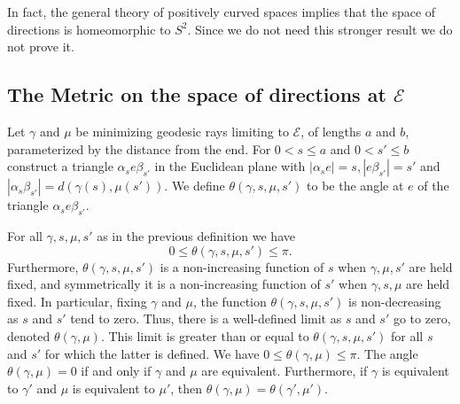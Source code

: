\begin{remark}
\label{rem:space-of-directions-topology}
In fact, the general theory of positively curved spaces implies that
the space of directions is homeomorphic to $S^2$. Since we do not
need this stronger result we do not prove it.
\end{remark}

\subsection{The Metric on the space of directions at ${\mathcal
E}$}



\begin{definition}
\label{def:angle-between-directions-theta}
\label{defntheta}
Let $\gamma$ and $\mu$ be minimizing geodesic rays limiting to
${\mathcal E}$, of lengths $a$ and $b$, parameterized by the
distance from the end. For $0<s\le a$ and $0<s'\le b$ construct a
triangle $\alpha_se\beta_{s'}$ in the Euclidean plane with
$|\alpha_se|=s, |e\beta_{s'}|=s'$ and
$|\alpha_s\beta_{s'}|=d(\gamma(s),\mu(s'))$. We define
$\theta(\gamma,s,\mu,s')$ to be the angle at $e$ of the triangle
$\alpha_se\beta_{s'}$.
\end{definition}

\begin{lemma}
\label{lem:theta-monotone-convergence}
\label{thetaconv}
For all $\gamma,s,\mu,s'$ as in the previous definition we have
$$0\le \theta(\gamma,s,\mu,s')\le \pi.$$ Furthermore,  $\theta(\gamma,s,\mu,s')$
is a non-increasing function of $s$  when $\gamma,\mu,s'$ are held
fixed, and symmetrically it is a non-increasing function of $s'$
when $\gamma,s,\mu$ are held fixed. In particular, fixing $\gamma$
and $\mu$, the function $\theta(\gamma,s,\mu,s')$ is non-decreasing
as $s$ and $s'$ tend to zero. Thus, there is a well-defined limit as
$s$ and $s'$ go to zero, denoted $ \theta(\gamma,\mu)$. This limit
is greater than or equal to $\theta(\gamma,s,\mu,s')$ for all $s$
and $s'$ for which the latter is defined. We have
$0\le\theta(\gamma,\mu)\le \pi$. The angle $\theta(\gamma,\mu)=0$ if
and only if $\gamma$ and $\mu$ are equivalent. Furthermore, if
$\gamma$ is equivalent to $\gamma'$ and $\mu$ is equivalent to
$\mu'$, then $\theta(\gamma,\mu)=\theta(\gamma',\mu')$.
\end{lemma}


